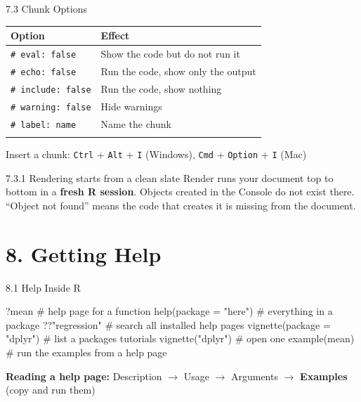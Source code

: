 \documentclass[
  ignorenonframetext,
  aspectratio=169,
]{beamer}
\newenvironment{Shaded}{\begin{snugshade}}{\end{snugshade}}
\newcommand{\AttributeTok}[1]{\textcolor[rgb]{0.40,0.45,0.13}{#1}}
\newcommand{\CommentTok}[1]{\textcolor[rgb]{0.37,0.37,0.37}{#1}}
\newcommand{\FunctionTok}[1]{\textcolor[rgb]{0.28,0.35,0.67}{#1}}
\newcommand{\NormalTok}[1]{\textcolor[rgb]{0.00,0.23,0.31}{#1}}
\newcommand{\StringTok}[1]{\textcolor[rgb]{0.13,0.47,0.30}{#1}}
\newcounter{none} %
\begin{document}
\begin{frame}[fragile]{7.3 Chunk Options}
\protect{}\label{chunk-options}
{\def\LTcaptype{none} %
\begin{longtable}[]{@{}ll@{}}
\toprule\noalign{}
Option & Effect \\
\midrule\noalign{}
\endhead
\texttt{\#\textbar{}\ eval:\ false} & Show the code but do not run it \\
\texttt{\#\textbar{}\ echo:\ false} & Run the code, show only the
output \\
\texttt{\#\textbar{}\ include:\ false} & Run the code, show nothing \\
\texttt{\#\textbar{}\ warning:\ false} & Hide warnings \\
\texttt{\#\textbar{}\ label:\ name} & Name the chunk \\
\bottomrule\noalign{}
\end{longtable}
}

Insert a chunk: \texttt{Ctrl} + \texttt{Alt} + \texttt{I} (Windows),
\texttt{Cmd} + \texttt{Option} + \texttt{I} (Mac)

\begin{alertblock}{7.3.1 Rendering starts from a clean slate}
\protect{}\label{rendering-starts-from-a-clean-slate}
Render runs your document top to bottom in a \textbf{fresh R session}.
Objects created in the Console do not exist there. ``Object not found''
means the code that creates it is missing from the document.
\end{alertblock}
\end{frame}

\section{8. Getting Help}\label{sec-help}

\begin{frame}[fragile]{8.1 Help Inside R}
\protect{}\label{help-inside-r}
\begin{Shaded}
\begin{Highlighting}[]
\NormalTok{?mean                         }\CommentTok{\# help page for a function}
\FunctionTok{help}\NormalTok{(}\AttributeTok{package =} \StringTok{"here"}\NormalTok{)        }\CommentTok{\# everything in a package}
\NormalTok{??}\StringTok{"regression"}                \CommentTok{\# search all installed help pages}
\FunctionTok{vignette}\NormalTok{(}\AttributeTok{package =} \StringTok{"dplyr"}\NormalTok{)   }\CommentTok{\# list a package\textquotesingle{}s tutorials}
\FunctionTok{vignette}\NormalTok{(}\StringTok{"dplyr"}\NormalTok{)             }\CommentTok{\# open one}
\FunctionTok{example}\NormalTok{(mean)                 }\CommentTok{\# run the examples from a help page}
\end{Highlighting}
\end{Shaded}

\textbf{Reading a help page:} Description \(\rightarrow\) Usage
\(\rightarrow\) Arguments \(\rightarrow\) \textbf{Examples} (copy and
run them)
\end{frame}
\end{document}
